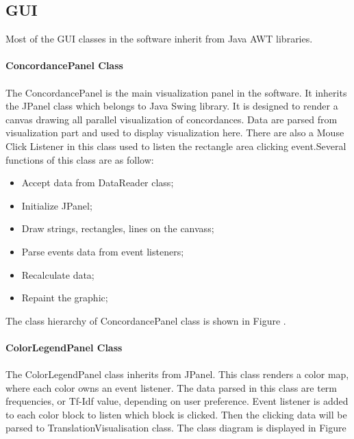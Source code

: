\subsection{GUI}
Most of the GUI classes in the software inherit from Java AWT libraries. 
\paragraph{ConcordancePanel Class}
\paragraph[]{}The ConcordancePanel is the main visualization panel in the software. It inherits the JPanel class which belongs to Java Swing library. It is designed to render a canvas drawing all parallel visualization of concordances. Data are parsed from visualization part and used to display visualization here. There are also a Mouse Click Listener in this class used to listen the rectangle area clicking event.Several functions of this class are as follow:
\begin{itemize}
	\item \textbf{}Accept data from DataReader class;
	\item \textbf{}Initialize JPanel;
	\item \textbf{}Draw strings, rectangles, lines on the canvass;
	\item \textbf{}Parse events data from event listeners;
	\item \textbf{}Recalculate data;
	\item \textbf{}Repaint the graphic;
\end{itemize}  
The class hierarchy of ConcordancePanel class is shown in Figure \label{concordancePanel}. 

\paragraph{ColorLegendPanel Class}
\paragraph[]{}The ColorLegendPanel class inherits from JPanel. This class renders a color map, where each color owns an event listener. The data parsed in this class are term frequencies, or Tf-Idf value, depending on user preference. Event listener is added to each color block to listen which block is clicked. Then the clicking data will be parsed to TranslationVisualisation class. The class diagram is displayed in Figure \label{colorLegendPanel}

